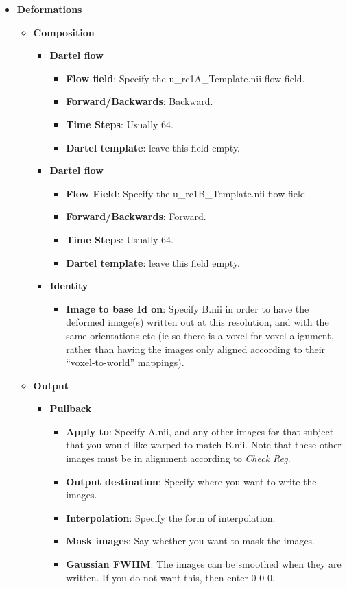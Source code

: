\begin{itemize}
\item {\bf Deformations}
  \begin{itemize}
  \item {\bf Composition}
    \begin{itemize}
    \item {\bf Dartel flow}
      \begin{itemize}
      \item {\bf Flow field}: Specify the u\_rc1A\_Template.nii flow field.
      \item {\bf Forward/Backwards}: Backward.
      \item {\bf Time Steps}: Usually 64.
      \item {\bf Dartel template}: leave this field empty.
      \end{itemize}
    \item {\bf Dartel flow}
      \begin{itemize}
      \item {\bf Flow Field}: Specify the u\_rc1B\_Template.nii flow field.
      \item {\bf Forward/Backwards}: Forward.
      \item {\bf Time Steps}: Usually 64.
      \item {\bf Dartel template}: leave this field empty.
      \end{itemize}
    \item {\bf Identity}
      \begin{itemize}
      \item {\bf Image to base Id on}: Specify B.nii in order to have the deformed image(s) written out at this resolution, and with the same orientations etc (ie so there is a voxel-for-voxel alignment, rather than having the images only aligned according to their ``voxel-to-world'' mappings).
      \end{itemize}
    \end{itemize}
  \item {\bf Output}
    \begin{itemize}
    \item {\bf Pullback}
      \begin{itemize}
      \item {\bf Apply to}: Specify A.nii, and any other images for that subject that you would like warped to match B.nii. Note that these other images must be in alignment according to \emph{Check Reg}.
      \item {\bf Output destination}: Specify where you want to write the images.
      \item {\bf Interpolation}: Specify the form of interpolation.
      \item {\bf Mask images}: Say whether you want to mask the images.
      \item {\bf Gaussian FWHM}: The images can be smoothed when they are written.  If you do not want this, then enter 0 0 0.
      \end{itemize}
    \end{itemize}
  \end{itemize}
\end{itemize}

